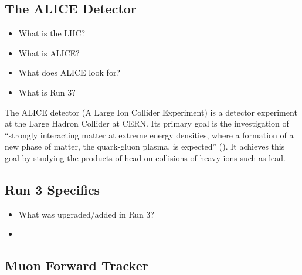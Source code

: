 \subsection{The ALICE Detector}
\begin{itemize}
    \item What is the LHC?
    \item What is ALICE?
    \item What does ALICE look for?
    \item What is Run 3?
\end{itemize}
The ALICE detector (A Large Ion Collider Experiment) is a detector experiment at the Large Hadron Collider at CERN. Its primary goal is the investigation of ``strongly interacting matter at extreme energy densities, where a formation of a new phase of matter, the quark-gluon plasma, is expected'' (\cite{ALICE_LOI}). It achieves this goal by studying the products of head-on collisions of heavy ions such as lead. 

\subsection{Run 3 Specifics}
\begin{itemize}
    \item What was upgraded/added in Run 3?
    \item 
\end{itemize}

\subsection{Muon Forward Tracker}